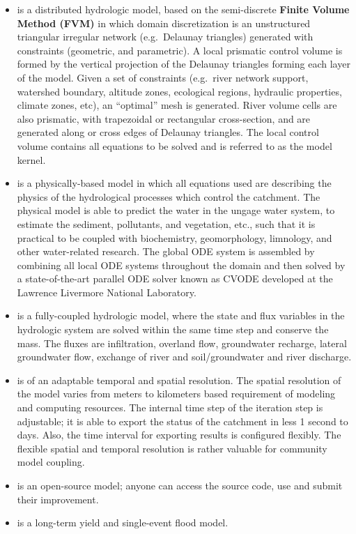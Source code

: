 \documentclass[
]{scrbook}
\providecommand{\tightlist}{%
  \setlength{\itemsep}{0pt}\setlength{\parskip}{0pt}}
\begin{document}
\begin{itemize}
\tightlist
\item
  is a distributed hydrologic model, based on the semi-discrete \textbf{Finite Volume Method (FVM)} in which domain discretization is an unstructured triangular irregular network (e.g.~Delaunay triangles) generated with constraints (geometric, and parametric). A local prismatic control volume is formed by the vertical projection of the Delaunay triangles forming each layer of the model. Given a set of constraints (e.g.~river network support, watershed boundary, altitude zones, ecological regions, hydraulic properties, climate zones, etc), an ``optimal'' mesh is generated. River volume cells are also prismatic, with trapezoidal or rectangular cross-section, and are generated along or cross edges of Delaunay triangles. The local control volume contains all equations to be solved and is referred to as the model kernel.
\item
  is a physically-based model in which all equations used are describing the physics of the hydrological processes which control the catchment. The physical model is able to predict the water in the ungage water system, to estimate the sediment, pollutants, and vegetation, etc., such that it is practical to be coupled with biochemistry, geomorphology, limnology, and other water-related research.
  The global ODE system is assembled by combining all local ODE systems throughout the domain and then solved by a state-of-the-art parallel ODE solver known as CVODE developed at the Lawrence Livermore National Laboratory.
\item
  is a fully-coupled hydrologic model, where the state and flux variables in the hydrologic system are solved within the same time step and conserve the mass. The fluxes are infiltration, overland flow, groundwater recharge, lateral groundwater flow, exchange of river and soil/groundwater and river discharge.
\item
  is of an adaptable temporal and spatial resolution. The spatial resolution of the model varies from meters to kilometers based requirement of modeling and computing resources. The internal time step of the iteration step is adjustable; it is able to export the status of the catchment in less 1 second to days. Also, the time interval for exporting results is configured flexibly. The flexible spatial and temporal resolution is rather valuable for community model coupling.
\item
  is an open-source model; anyone can access the source code, use and submit their improvement.
\item
  is a long-term yield and single-event flood model.
\end{itemize}
\end{document}
